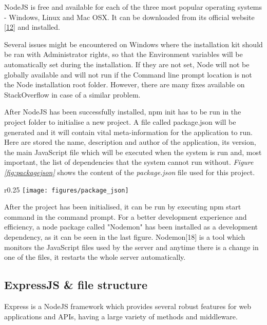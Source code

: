 NodeJS is free and available for each of the three most popular operating systems - Windows, Linux and Mac OSX. It can be downloaded from its official website \ref{12} and installed.

Several issues might be encountered on Windows where the installation kit should be ran with Administrator rights, so that the Environment variables will be automatically set during the installation. If they are not set, Node will not be globally available and will not run if the Command line prompt location is not the Node installation root folder. However, there are many fixes available on StackOverflow in case of a similar problem.

After NodeJS has been successfully installed, npm init has to be run in the project folder to initialise a new project. A file called package.json will be generated and it will contain vital meta-information for the application to run. Here are stored the name, description and author of the application, its version, the main JavaScript file which will be executed when the system is run and, most important, the list of dependencies that the system cannot run without. \textit{Figure \ref{fig:packagejson}} shows the content of the \textit{package.json} file used for this project.

\begin{wrapfigure}{r}{0.25\textwidth}
\centering
\vspace{-2em}
\texttt{[image: figures/package\_json]}
\caption{Node's \textit{package.json}}
\vspace{-5em}
\label{fig:packagejson}
\end{wrapfigure}

After the project has been initialised, it can be run by executing npm start command in the command prompt. For a better development experience and efficiency, a node package called "Nodemon" has been installed as a development dependency, as it can be seen in the last figure. Nodemon[18] is a tool which monitors the JavaScript files used by the server and anytime there is a change in one of the files, it restarts the whole server automatically.

\subsection{ExpressJS \& file structure}

Express is a NodeJS framework which provides several robust features for web applications and APIs, having a large variety of methods and middleware.

